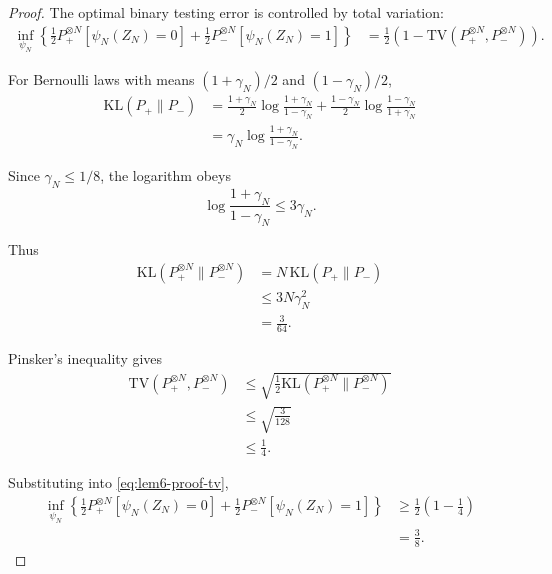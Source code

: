 \documentclass{article} %
\begin{document}
\begin{proof}
The optimal binary testing error is controlled by total variation:
\begin{align}
\inf_{\psi_N}
\left\{
\frac12 P_+^{\otimes N}\!\left[\psi_N(Z_N)=0\right]
+
\frac12 P_-^{\otimes N}\!\left[\psi_N(Z_N)=1\right]
\right\}
&=
\frac12
\left(
1-\mathrm{TV}(P_+^{\otimes N},P_-^{\otimes N})
\right).
\label{eq:lem6-proof-tv}
\end{align}

For Bernoulli laws with means \((1+\gamma_N)/2\) and \((1-\gamma_N)/2\),
\begin{align}
\mathrm{KL}(P_+\|P_-)
&=
\frac{1+\gamma_N}{2}
\log\frac{1+\gamma_N}{1-\gamma_N}
+
\frac{1-\gamma_N}{2}
\log\frac{1-\gamma_N}{1+\gamma_N}
\label{eq:lem6-proof-kl-a}
\\
&=
\gamma_N
\log\frac{1+\gamma_N}{1-\gamma_N}.
\label{eq:lem6-proof-kl-b}
\end{align}

Since \(\gamma_N\le 1/8\), the logarithm obeys
\begin{equation}
\label{eq:lem6-proof-log}
\log\frac{1+\gamma_N}{1-\gamma_N}
\le
3\gamma_N .
\end{equation}

Thus
\begin{align}
\mathrm{KL}(P_+^{\otimes N}\|P_-^{\otimes N})
&=
N\,\mathrm{KL}(P_+\|P_-)
\label{eq:lem6-proof-product}
\\
&\le
3N\gamma_N^2
\label{eq:lem6-proof-kl-c}
\\
&=
\frac{3}{64}.
\label{eq:lem6-proof-kl-d}
\end{align}

Pinsker's inequality gives
\begin{align}
\mathrm{TV}(P_+^{\otimes N},P_-^{\otimes N})
&\le
\sqrt{
\frac12
\mathrm{KL}(P_+^{\otimes N}\|P_-^{\otimes N})
}
\label{eq:lem6-proof-pinsker-a}
\\
&\le
\sqrt{\frac{3}{128}}
\label{eq:lem6-proof-pinsker-b}
\\
&\le
\frac14 .
\label{eq:lem6-proof-pinsker-c}
\end{align}

Substituting into \eqref{eq:lem6-proof-tv},
\begin{align}
\inf_{\psi_N}
\left\{
\frac12 P_+^{\otimes N}\!\left[\psi_N(Z_N)=0\right]
+
\frac12 P_-^{\otimes N}\!\left[\psi_N(Z_N)=1\right]
\right\}
&\ge
\frac12\left(1-\frac14\right)
\label{eq:lem6-proof-final-a}
\\
&=
\frac{3}{8}.
\label{eq:lem6-proof-final-b}
\end{align}
\end{proof}
\end{document}
